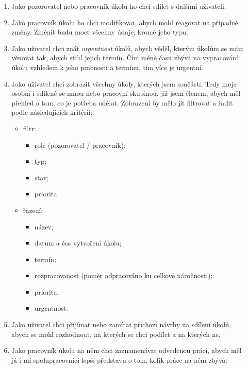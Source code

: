 \documentclass[thesis=B,czech]{FITthesis}[2012/06/26]
\begin{document}
\begin{enumerate}
\begin{enumerate}
				\item Jako pozorovatel nebo pracovník úkolu ho chci sdílet s dalšími uživateli.
				
				\item Jako pracovník úkolu ho chci modifikovat, abych mohl reagovat na případné změny. Změnit budu moct všechny údaje, kromě jeho typu.
				
				\item Jako uživatel chci znát \textit{urgentnost} úkolů, abych věděl, kterým úkolům se mám věnovat tak, abych stihl jejich termín. Čím méně času zbývá na vypracování úkolu vzhledem k jeho pracnosti a termínu, tím více je urgentní.
				
				\item Jako uživatel chci zobrazit všechny úkoly, kterých jsem součástí. Tedy moje osobní i sdílené se mnou nebo pracovní skupinou, již jsem členem, abych měl přehled o tom, co je potřeba udělat. Zobrazení by mělo jít filtrovat a řadit podle následujících kritérií:
				\begin{itemize}
					\item filtr:
					\begin{itemize}
						\item role (pozorovatel / pracovník);
						\item typ;
						\item stav;
						\item priorita.
					\end{itemize}
					\item řazení:
					\begin{itemize}
						\item název;
						\item datum a čas vytvoření úkolu;
						\item termín;
						\item rozpracovanost (poměr odpracováno ku celkové náročnosti);
						\item priorita;
						\item urgentnost.
					\end{itemize}
				\end{itemize}
				
				\item Jako uživatel chci přijímat nebo zamítat příchozí návrhy na sdílení úkolů, abych se mohl rozhodnout, na kterých se chci podílet a na kterých ne.
				
				\item Jako pracovník úkolu na něm chci zaznamenávat odvedenou práci, abych měl já i mí spolupracovníci lepší představu o tom, kolik práce na něm zbývá.
				

\end{enumerate}
\end{enumerate}
\end{document}
